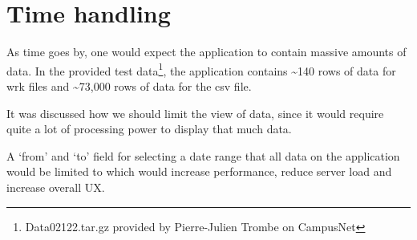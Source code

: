 \section{Time handling}
\label{sec:time_handling}
As time goes by, one would expect the application to contain massive amounts of data.
In the provided test data\footnote{Data02122.tar.gz provided by Pierre-Julien Trombe on CampusNet}, the application contains \textasciitilde 140 rows of data for \textsf{wrk} files and \textasciitilde 73,000 rows of data for the \textsf{csv} file.

It was discussed how we should limit the view of data, since it would require quite a lot of processing power to display that much data.

A `from' and `to' field for selecting a date range that all data on the application would be limited to which would increase performance, reduce server load and increase overall UX.